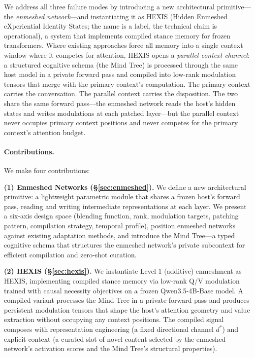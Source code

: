 We address all three failure modes by introducing a new architectural primitive---the \emph{enmeshed network}---and instantiating it as HEXIS (Hidden Enmeshed eXperiential Identity States; the name is a label, the technical claim is operational), a system that implements compiled stance memory for frozen transformers. Where existing approaches force all memory into a single context window where it competes for attention, HEXIS opens a \emph{parallel context channel}: a structured cognitive schema (the Mind Tree) is processed through the same host model in a private forward pass and compiled into low-rank modulation tensors that merge with the primary context's computation. The primary context carries the conversation. The parallel context carries the disposition. The two share the same forward pass---the enmeshed network reads the host's hidden states and writes modulations at each patched layer---but the parallel context never occupies primary context positions and never competes for the primary context's attention budget.

\paragraph{Contributions.} We make four contributions:

\textbf{(1) Enmeshed Networks (\S\ref{sec:enmeshed}).} We define a new architectural primitive: a lightweight parametric module that shares a frozen host's forward pass, reading and writing intermediate representations at each layer. We present a six-axis design space (blending function, rank, modulation targets, patching pattern, compilation strategy, temporal profile), position enmeshed networks against existing adaptation methods, and introduce the Mind Tree---a typed cognitive schema that structures the enmeshed network's private subcontext for efficient compilation and zero-shot curation.

\textbf{(2) HEXIS (\S\ref{sec:hexis}).} We instantiate Level 1 (additive) enmeshment as HEXIS, implementing compiled stance memory via low-rank Q/V modulation trained with causal necessity objectives on a frozen Qwen3.5-4B-Base model. A compiled variant processes the Mind Tree in a private forward pass and produces persistent modulation tensors that shape the host's attention geometry and value extraction without occupying any context positions. The compiled signal composes with representation engineering (a fixed directional channel $d^*$) and explicit context (a curated slot of novel content selected by the enmeshed network's activation scores and the Mind Tree's structural properties).

